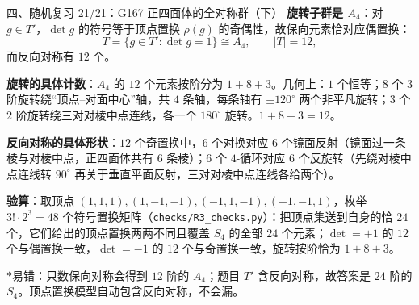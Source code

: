 \documentclass[aspectratio=169,10pt,fontset=none]{ctexbeamer}
\newcommand{\key}[1]{\textcolor{ink}{\bfseries #1}}
\newcommand{\starpt}{\textcolor{accent}{\bfseries$\ast$}}
\begin{document}
\begin{frame}[t]{四、随机复习 21/21：G167 正四面体的全对称群（下）}
\scriptsize
\key{旋转子群是 $A_4$}：对 $g\in T'$，$\det g$ 的符号等于顶点置换 $\rho(g)$ 的奇偶性，故保向元素恰对应偶置换：
\[ T=\{g\in T':\det g=1\}\cong A_4,\qquad |T|=12, \]
而反向对称有 $12$ 个。

\key{旋转的具体计数}：$A_4$ 的 $12$ 个元素按阶分为 $1+8+3$。几何上：$1$ 个恒等；$8$ 个 $3$ 阶旋转绕“顶点--对面中心”轴，共 $4$ 条轴，每条轴有 $\pm120^\circ$ 两个非平凡旋转；$3$ 个 $2$ 阶旋转绕三对对棱中点连线，各一个 $180^\circ$ 旋转。$1+8+3=12$。

\key{反向对称的具体形状}：$12$ 个奇置换中，$6$ 个对换对应 $6$ 个镜面反射（镜面过一条棱与对棱中点，正四面体共有 $6$ 条棱）；$6$ 个 $4$-循环对应 $6$ 个反旋转（先绕对棱中点连线转 $90^\circ$ 再关于垂直平面反射，三对对棱中点连线各给两个）。

\key{验算}：取顶点 $(1,1,1),(1,-1,-1),(-1,1,-1),(-1,-1,1)$，枚举 $3!\cdot2^3=48$ 个符号置换矩阵（\texttt{checks/R3\_checks.py}）：把顶点集送到自身的恰 $24$ 个，它们给出的顶点置换两两不同且覆盖 $S_4$ 的全部 $24$ 个元素；$\det=+1$ 的 $12$ 个与偶置换一致，$\det=-1$ 的 $12$ 个与奇置换一致，旋转按阶恰为 $1+8+3$。

\starpt{}易错：只数保向对称会得到 $12$ 阶的 $A_4$；题目 $T'$ 含反向对称，故答案是 $24$ 阶的 $S_4$。顶点置换模型自动包含反向对称，不会漏。
\end{frame}

\end{document}
